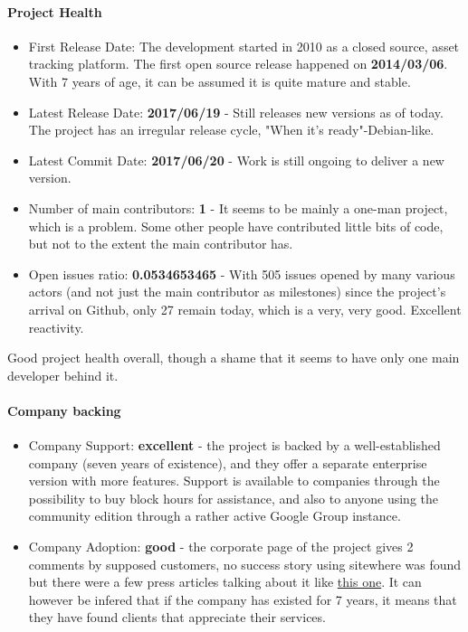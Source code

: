\documentclass{article}
\begin{document}
\paragraph{Project Health}

\begin{itemize}
\item First Release Date: The development started in 2010 as a closed source, asset tracking platform. The first open source release happened on \textbf{2014/03/06}. With 7 years of age, it can be assumed it is quite mature and stable.
\item Latest Release Date: \textbf{2017/06/19} - Still releases new versions as of today. The project has an irregular release cycle, "When it's ready"-Debian-like.
\item Latest Commit Date: \textbf{2017/06/20} - Work is still ongoing to deliver a new version.
\item Number of main contributors: \textbf{1} - It seems to be mainly a one-man project, which is a problem. Some other people have contributed little bits of code, but not to the extent the main contributor has.
\item Open issues ratio: \textbf{0.0534653465} - With 505 issues opened by many various actors (and not just the main contributor as milestones) since the project's arrival on Github, only 27 remain today, which is a very, very good. Excellent reactivity.
\end{itemize}

Good project health overall, though a shame that it seems to have only one main developer behind it.

\paragraph{Company backing}

\begin{itemize}
\item Company Support: \textbf{excellent} - the project is backed by a well-established company (seven years of existence), and they offer a separate enterprise version with more features. Support is available to companies through the possibility to buy block hours for assistance, and also to anyone using the community edition through a rather active Google Group instance.
\item Company Adoption: \textbf{good} - the corporate page of the project gives 2 comments by supposed customers, no success story using sitewhere was found but there were a few press articles talking about it like \href{https://opensourceforu.com/2017/07/sitewhere-open-platform-connected-devices/?utm_content=buffer4c828&utm_medium=social&utm_source=twitter.com&utm_campaign=buffer}{this one}. It can however be infered that if the company has existed for 7 years, it means that they have found clients that appreciate their services.
\end{itemize}
\end{document}
